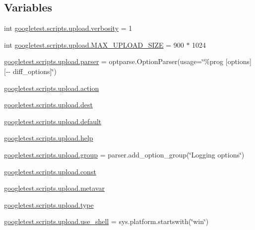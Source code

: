 \subsection*{Variables}
\begin{DoxyCompactItemize}
\item 
int \mbox{\hyperlink{namespacegoogletest_1_1scripts_1_1upload_abe7b64a3f038e5407f5e145b7f971516}{googletest.\+scripts.\+upload.\+verbosity}} = 1
\item 
int \mbox{\hyperlink{namespacegoogletest_1_1scripts_1_1upload_a47882bc222a2222d08b4befb06c69d78}{googletest.\+scripts.\+upload.\+M\+A\+X\+\_\+\+U\+P\+L\+O\+A\+D\+\_\+\+S\+I\+ZE}} = 900 $\ast$ 1024
\item 
\mbox{\hyperlink{namespacegoogletest_1_1scripts_1_1upload_a85516a49cb971d6891f3c1a2b8c430cb}{googletest.\+scripts.\+upload.\+parser}} = optparse.\+Option\+Parser(usage=\char`\"{}\%prog \mbox{[}options\mbox{]} \mbox{[}-\/-\/ diff\+\_\+options\mbox{]}\char`\"{})
\item 
\mbox{\hyperlink{namespacegoogletest_1_1scripts_1_1upload_a472f6039c406e5432e919cea48e2792e}{googletest.\+scripts.\+upload.\+action}}
\item 
\mbox{\hyperlink{namespacegoogletest_1_1scripts_1_1upload_a4dc121473a21a6f590c371d0a34c8c57}{googletest.\+scripts.\+upload.\+dest}}
\item 
\mbox{\hyperlink{namespacegoogletest_1_1scripts_1_1upload_a6fa0d21d701111be3e97b5f821061868}{googletest.\+scripts.\+upload.\+default}}
\item 
\mbox{\hyperlink{namespacegoogletest_1_1scripts_1_1upload_ad77803baab60b5ff1cd91eb58e090e7b}{googletest.\+scripts.\+upload.\+help}}
\item 
\mbox{\hyperlink{namespacegoogletest_1_1scripts_1_1upload_a2f42d513d02d19d2d7b0f94c5fde9130}{googletest.\+scripts.\+upload.\+group}} = parser.\+add\+\_\+option\+\_\+group(\char`\"{}Logging options\char`\"{})
\item 
\mbox{\hyperlink{namespacegoogletest_1_1scripts_1_1upload_a2a657aae16e12c0ed5a65e13ac04c467}{googletest.\+scripts.\+upload.\+const}}
\item 
\mbox{\hyperlink{namespacegoogletest_1_1scripts_1_1upload_a28bb93b0415b36d0037bfa64dc0d006d}{googletest.\+scripts.\+upload.\+metavar}}
\item 
\mbox{\hyperlink{namespacegoogletest_1_1scripts_1_1upload_a2f99d402ccc74added8b3e1af9739cd0}{googletest.\+scripts.\+upload.\+type}}
\item 
\mbox{\hyperlink{namespacegoogletest_1_1scripts_1_1upload_a09a5816b63d2ed9b59e864d6f5b1828f}{googletest.\+scripts.\+upload.\+use\+\_\+shell}} = sys.\+platform.\+startswith(\char`\"{}win\char`\"{})
\end{DoxyCompactItemize}
